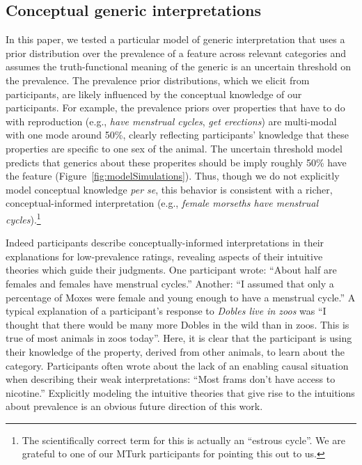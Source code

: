 \documentclass[,man,floatsintext]{apa6}
\let\rmarkdownfootnote\footnote%
\def\footnote{\protect\rmarkdownfootnote}
\theoremstyle{definition}
\theoremstyle{definition}
\theoremstyle{definition}
\theoremstyle{remark}
\begin{document}
\hypertarget{conceptual-generic-interpretations}{%
\subsection{Conceptual generic
interpretations}\label{conceptual-generic-interpretations}}

In this paper, we tested a particular model of generic interpretation
that uses a prior distribution over the prevalence of a feature across
relevant categories and assumes the truth-functional meaning of the
generic is an uncertain threshold on the prevalence. The prevalence
prior distributions, which we elicit from participants, are likely
influenced by the conceptual knowledge of our participants. For example,
the prevalence priors over properties that have to do with reproduction
(e.g., \emph{have menstrual cycles}, \emph{get erections}) are
multi-modal with one mode around 50\%, clearly reflecting participants'
knowledge that these properties are specific to one sex of the animal.
The uncertain threshold model predicts that generics about these
properites should be imply roughly 50\% have the feature
(Figure~\ref{fig:modelSimulations}). Thus, though we do not explicitly
model conceptual knowledge \emph{per se}, this behavior is consistent
with a richer, conceptual-informed interpretation (e.g., \emph{female
morseths have menstrual cycles}).\footnote{The scientifically correct
  term for this is actually an \enquote{estrous cycle}. We are grateful
  to one of our MTurk participants for pointing this out to us. }

Indeed participants describe conceptually-informed interpretations in
their explanations for low-prevalence ratings, revealing aspects of
their intuitive theories which guide their judgments. One participant
wrote: \enquote{About half are females and females have menstrual
cycles.} Another: \enquote{I assumed that only a percentage of Moxes
were female and young enough to have a menstrual cycle.} A typical
explanation of a participant's response to \emph{Dobles live in zoos}
was \enquote{I thought that there would be many more Dobles in the wild
than in zoos. This is true of most animals in zoos today}. Here, it is
clear that the participant is using their knowledge of the property,
derived from other animals, to learn about the category. Participants
often wrote about the lack of an enabling causal situation when
describing their weak interpretations: \enquote{Most frams don't have
access to nicotine.} Explicitly modeling the intuitive theories that
give rise to the intuitions about prevalence is an obvious future
direction of this work.
\end{document}
